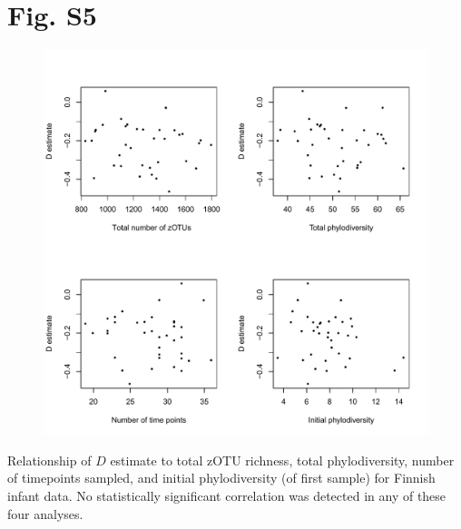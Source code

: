 \documentclass{article}
\begin{document}
\section*{Fig. S5}
\begin{figure}[ht]
	\centering
	\includegraphics[scale=0.80]{../Fig_S5.pdf}
\end{figure}
Relationship of \(D\) estimate to total zOTU richness, total phylodiversity, number of timepoints sampled, and initial phylodiversity (of first sample) for Finnish infant data. No statistically significant correlation was detected in any of these four analyses. 
%
\end{document}
